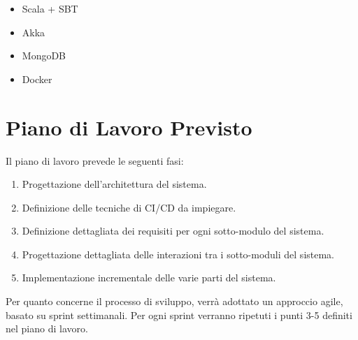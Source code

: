 \documentclass[12pt,a4paper,openright,twoside]{book}
\begin{document}
\begin{itemize}
    \item Scala + SBT
    \item Akka
    \item MongoDB
    \item Docker
\end{itemize}

\chapter{Piano di Lavoro Previsto}
\label{chap:expectedWorkPlan}

Il piano di lavoro prevede le seguenti fasi:

\begin{enumerate}
    \item Progettazione dell'architettura del sistema.
    \item Definizione delle tecniche di CI/CD da impiegare.
    \item Definizione dettagliata dei requisiti per ogni sotto-modulo del sistema.
    \item Progettazione dettagliata delle interazioni tra i sotto-moduli del sistema.
    \item Implementazione incrementale delle varie parti del sistema.
\end{enumerate}

Per quanto concerne il processo di sviluppo, verrà adottato un approccio agile, basato su sprint settimanali. Per ogni sprint verranno ripetuti i punti 3-5 definiti nel piano di lavoro.


%
%
\end{document}
